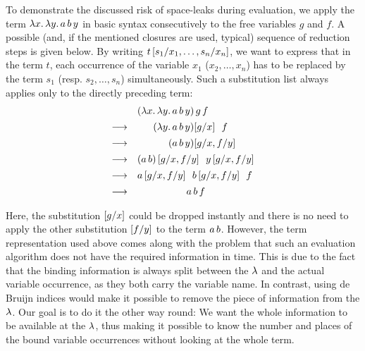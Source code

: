 \documentclass[submission,copyright,creativecommons]{eptcs}
\begin{document}
To demonstrate the discussed risk of space-leaks during evaluation, we apply the term $\lambda {x}. \, \lambda {y}. \, a \, b \, y$ in basic syntax consecutively to the free variables $g$ and $f$. A possible (and, if the mentioned closures are used, typical) sequence of reduction steps is given below.  
By writing $t\left[ s_1 / x_1 , \ldots, s_n / x_n \right]$, we want to express that in the term $t$, each occurrence of the variable $x_1$ ($x_2, \ldots, x_n$) has to be replaced by the term $s_1$ (resp. $s_2, \ldots, s_n$) simultaneously. Such a substitution list always applies only to the directly preceding term:
\[
\begin{array}{lr@{}l}
\shspace &(\LaA x {\LaA y {\ApA{\ApA a b} y}}) & \sspace g \sspace f \\ 
\shspace\re &(\LaA y {\ApA{\ApA a b} y}) & \sub g x \lspace f \\ 
\shspace\re &      (\ApA{\ApA a b} y) & \subs g x f y \\ 
\shspace\re &      \multicolumn 2 l {(a\sspace b)\subs g x f y \lspace y\subs g x f y} \\ 
\shspace\re &      \multicolumn 2 l {a\subs g x f y \lspace b\subs g x f y \lspace f} \\ 
\shspace\re &      \multicolumn 2 {c} {a \sspace b \sspace f}  \\ 
\end{array}
\]
Here, the substitution $\left[ g / x \right]$ could be dropped instantly and there is no need to apply the other substitution $\left[ f / y \right]$ to the term $a \, b$. 
However, the term representation used above comes along with the problem that such an evaluation algorithm does not have the required information in time.
This is due to the fact that the binding information is always split between the $\lambda$ and the actual variable occurrence, as they both carry the variable name.  
In contrast, using de Bruijn indices would make it possible to remove the piece of information from the $\lambda$.
Our goal is to do it the other way round: We want the whole information to be available at the $\lambda$, thus making it possible to know the number and places of the bound variable occurrences without looking at the whole term.


\end{document}
